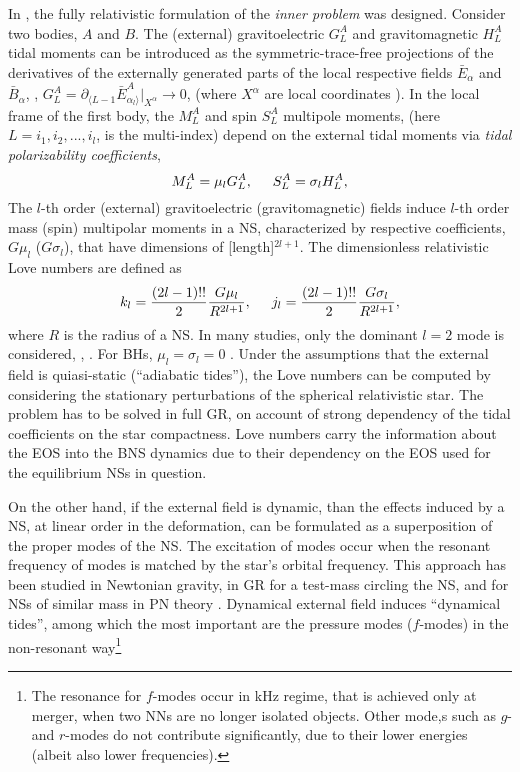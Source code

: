 In \cite{33,32,34}, the fully relativistic formulation of the \textit{inner problem} was 
designed. Consider two bodies, $A$ and $B$. 
The (external) gravitoelectric $G_L^A$ and gravitomagnetic $H_L^A$ tidal moments can be 
introduced as the 
symmetric-trace-free projections of the derivatives of the externally generated parts of 
the local respective fields $\bar{E}_{\alpha}$ and $\bar{B}_{\alpha}$, \eg, 
$G_L^A = \partial_{\langle L-1}\bar{E}^A_{\alpha_l\rangle}|_{X^{\alpha}}\rightarrow 0$, 
(where $X^{\alpha}$ are local coordinates \cite{32}).
In the local frame of the first body, the  $M_L ^A$ and spin 
$S_L ^A$ multipole moments, (here $L=i_1,i_2,...,i_l$, is the multi-index) depend on the external
tidal moments via \textit{tidal polarizability coefficients}, 
%
\begin{equation}
    M_{L}^{A} = \mu_l G_{L}^A, \hspace{5mm} S_{L}^A = \sigma_l H_L^A,
\end{equation}
%
The $l$-th order (external) gravitoelectric (gravitomagnetic) fields induce $l$-th order 
mass (spin) multipolar moments in a \ac{NS}, characterized by respective coefficients, 
$G\mu_l$ ($G\sigma_l$), that have dimensions of [length]$^{2l+1}$.
%
The dimensionless relativistic Love numbers are defined as
%
\begin{equation}
    k_l = \frac{(2l - 1)!!}{2}\frac{G\mu_l}{R^{2l + 1}}, \hspace{5mm} j_l = \frac{(2l-1)!!}{2}\frac{G\sigma_l}{R^{2l+1}},
\end{equation}
%
where $R$ is the radius of a \ac{NS}. 
In many studies, only the dominant $l=2$ mode is considered, \eg, \cite{33}. 
For \acp{BH}, $\mu_l=\sigma_l=0$ \cite{32,34}.
%
Under the assumptions that the external field is quiasi-static (``adiabatic tides''), the 
Love numbers can be computed by considering the stationary perturbations of the spherical 
relativistic star. 
%
The problem has to be solved in full \ac{GR}, on account of strong dependency of the 
tidal coefficients on the star compactness. 
% 
Love numbers carry the information about the \ac{EOS} into the \ac{BNS} dynamics due to 
their dependency on the \ac{EOS} used for the equilibrium \acp{NS} in question.

On the other hand, if the external field is dynamic, than the effects induced by a \ac{NS}, 
at linear order in the deformation, can be formulated as a superposition of the proper modes 
of the \ac{NS}. The excitation of modes occur when the resonant frequency of modes is matched 
by the star's orbital frequency. 
This approach has been studied in Newtonian gravity, in GR for a test-mass circling the 
\ac{NS}, and for \acp{NS} of similar mass in \ac{PN} theory \cite{35,36,37}.
Dynamical external field induces ``dynamical tides'', among which the most important are the 
pressure modes ($f$-modes) in the non-resonant way\footnote{
    The resonance for $f$-modes occur in kHz
    regime, that is achieved only at merger, when two \acp{NN} are no longer isolated objects. 
    Other mode,s such as $g$- and $r$-modes do not contribute significantly, due to their 
    lower energies (albeit also lower frequencies).
}

